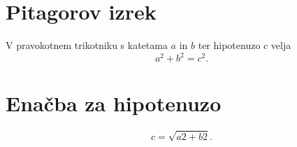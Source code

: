\documentclass{article}
\begin{document}
\section*{Pitagorov izrek}
V pravokotnem trikotniku s katetama \(a\) in \(b\) ter hipotenuzo \(c\) velja
\[ a^2 + b^2 = c^2.\]
\section{Enačba za hipotenuzo}
\[ c = \sqrt{a2+b2}.\]
\end{document}
